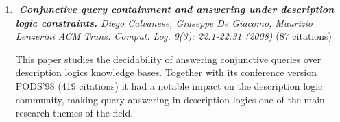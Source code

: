 \begin{enumerate}









\item \textit{\textbf{Conjunctive query containment and answering under description logic constraints.} Diego Calvanese, Giuseppe De Giacomo, Maurizio Lenzerini ACM Trans. Comput. Log. 9(3): 22:1-22:31 (2008)} (87 citations)



This paper studies the decidability of answering conjunctive queries over description logics knowledge bases. Together with its conference version PODS'98 (419 citations) it had a notable impact on the description logic community, making query answering in description logics one of the main research themes of the field. 


\end{enumerate}
